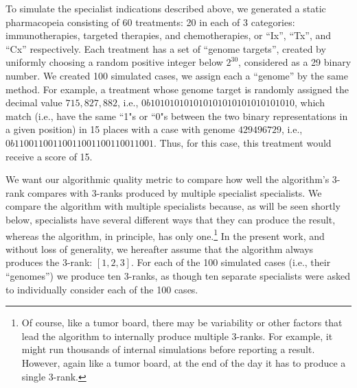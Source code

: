 \documentclass{article}
\begin{document}
To simulate the specialist indications described above, we generated a static pharmacopeia consisting of 60 treatments: 20 in each of 3 categories: immunotherapies, targeted therapies, and chemotherapies, or ``Ix'', ``Tx'', and ``Cx'' respectively. Each treatment has a set of ``genome targets'', created by uniformly choosing a random positive integer below $2^{30}$, considered as a 29 binary number. We created 100 simulated cases, we assign each a ``genome'' by the same method. For example, a treatment whose genome target is randomly assigned the decimal value $715,827,882$, i.e., $0b101010101010101010101010101010$, which match (i.e., have the same ``1"s or ``0"s between the two binary representations in a given position) in 15 places with a case with genome $429496729$, i.e.,  $0b11001100110011001100110011001$. Thus, for this case, this treatment would receive a score of 15.  

We want our algorithmic quality metric to compare how well the algorithm's 3-rank compares with 3-ranks produced by multiple specialist specialists. We compare the algorithm with multiple specialists because, as will be seen shortly below, specialists have several different ways that they can produce the result, whereas the algorithm, in principle, has only one.\footnote{Of course, like a tumor board, there may be variability or other factors that lead the algorithm to internally produce multiple 3-ranks. For example, it might run thousands of internal simulations before reporting a result. However, again like a tumor board, at the end of the day it has to produce a single 3-rank.} In the present work, and without loss of generality, we hereafter assume that the algorithm always produces the 3-rank: $[1,2,3]$. For each of the 100 simulated cases (i.e., their ``genomes'') we produce ten 3-ranks, as though ten separate specialists were asked to individually consider each of the 100 cases. 
\end{document}
